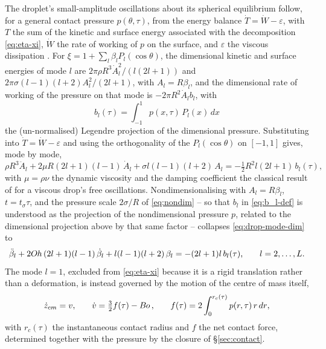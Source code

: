 The droplet's small-amplitude oscillations about its spherical equilibrium follow, for a general contact pressure $p(\theta,\tau)$, from the energy balance $\dot T=\dot W-\varepsilon$, with $T$ the sum of the kinetic and surface energy associated with the decomposition \eqref{eq:eta-xi}, $\dot W$ the rate of working of $p$ on the surface, and $\varepsilon$ the viscous dissipation \citep{lamb1924hydrodynamics}. For $\xi=1+\sum_l\beta_lP_l(\cos\theta)$, the dimensional kinetic and surface energies of mode $l$ are $2\pi\rho R^3\dot A_l^2/(l(2l+1))$ and $2\pi\sigma(l-1)(l+2)A_l^2/(2l+1)$, with $A_l=R\beta_l$, and the dimensional rate of working of the pressure on that mode is $-2\pi R^2\dot A_lb_l$, with
\begin{equation}
    b_l(\tau) = \int_{-1}^1 p(x,\tau)\, P_l(x)\, dx
    \label{eq:b_l-def}
\end{equation}
the (un-normalised) Legendre projection of the dimensional pressure. Substituting into $\dot T=\dot W-\varepsilon$ and using the orthogonality of the $P_l(\cos\theta)$ on $[-1,1]$ gives, mode by mode,
\begin{equation}
    \rho R^3\ddot A_l + 2\mu R(2l+1)(l-1)\,\dot A_l + \sigma l(l-1)(l+2)\,A_l = -\tfrac12R^2l(2l+1)\,b_l(\tau)\text{,}
    \label{eq:drop-mode-dim}
\end{equation}
with $\mu=\rho\nu$ the dynamic viscosity and the damping coefficient the classical result of \cite{lamb1924hydrodynamics} for a viscous drop's free oscillations. Nondimensionalising with $A_l=R\beta_l$, $t=t_\sigma\tau$, and the pressure scale $2\sigma/R$ of \eqref{eq:nondim} -- so that $b_l$ in \eqref{eq:b_l-def} is understood as the projection of the nondimensional pressure $p$, related to the dimensional projection above by that same factor -- collapses \eqref{eq:drop-mode-dim} to
\begin{equation}
    \ddot\beta_l + 2O\kern-0.04em h\,(2l+1)(l-1)\, \dot\beta_l + l(l-1)(l+2)\, \beta_l = -(2l+1)l\, b_l(\tau)\text{,}\qquad l=2,\dots,L\text{.}
    \label{eq:drop-mode}
\end{equation}
The mode $l=1$, excluded from \eqref{eq:eta-xi} because it is a rigid translation rather than a deformation, is instead governed by the motion of the centre of mass itself,
\begin{equation}
    \dot z_{cm} = v\text{,}\qquad \dot v = \tfrac32 f(\tau) - B\kern-0.04em o\,\text{,}\qquad f(\tau) = 2\int_0^{r_c(\tau)} p(r,\tau)\, r\, dr\text{,}
    \label{eq:com}
\end{equation}
with $r_c(\tau)$ the instantaneous contact radius and $f$ the net contact force, determined together with the pressure by the closure of \S\ref{sec:contact}.


